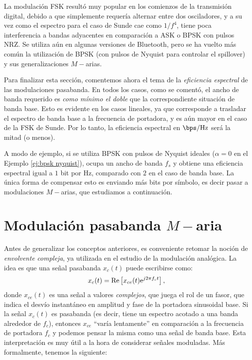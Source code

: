 \begin{ejemplo}
La modulación FSK resultó muy popular en los comienzos de la transmisión digital, debido a que simplemente requería alternar entre dos osciladores, y a su vez como el espectro para el caso de Sunde cae como $1/f^4$, tiene poca interferencia a bandas adyacentes en comparación a ASK o BPSK con pulsos NRZ. Se utiliza aún en algunas versiones de Bluetooth, pero se ha vuelto más común la utilización de BPSK (con pulsos de Nyquist para controlar el spillover) y sus generalizaciones $M-$arias.
\end{ejemplo}

Para finalizar esta sección, comentemos ahora el tema de la \emph{eficiencia espectral} de las modulaciones pasabanda. En todos los casos, como se comentó, el ancho de banda requerido es \emph{como mínimo el doble} que la correspondiente situación de banda base. Esto es evidente en los casos lineales, ya que corresponde a trasladar el espectro de banda base a la frecuencia de portadora, y es aún mayor en el caso de la FSK de Sunde. Por lo tanto, la eficiencia espectral en $\unit{\bps/\hertz}$ será la mitad (o menos).

A modo de ejemplo, si se utiliza BPSK con pulsos de Nyquist ideales ($\alpha=0$ en el Ejemplo \ref{ej:bpsk nyquist}), ocupa un ancho de banda $f_s$ y obtiene una eficiencia espectral igual a $1$ bit por $\unit{\hertz}$, comparado con $2$ en el caso de banda base. La única forma de compensar esto es enviando más bits por símbolo, es decir pasar a modulaciones $M-$arias, que estudiamos a continuación.

\section{Modulación pasabanda $M-$aria}\label{sec:modulacion pasabanda m aria}

Antes de generalizar los conceptos anteriores, es conveniente retomar la noción de \emph{envolvente compleja}, ya utilizada en el estudio de la modulación analógica. La idea es que una señal pasabanda $x_c(t)$ puede escribirse como:
\begin{equation}\label{eq:transformada pasabanda}
    x_c(t) = \mathrm{Re}\left[x_{ce}(t)\mathrm{e}^{j2\pi f_c t}\right],
\end{equation}
donde $x_{ce}(t)$ es una señal a valores \emph{complejos}, que juega el rol de un fasor, que indica el desvío instantáneo en amplitud y fase de la portadora sinusoidal base. Si la señal $x_c(t)$ es pasabanda (es decir, tiene un espectro acotado a una banda alrededor de $f_c$), entonces $x_{ce}$ ``varía lentamente'' en comparación a la frecuencia de portadora $f_c$ y podemos pensar la misma como una señal de banda base. Esta interpretación es muy útil a la hora de considerar señales moduladas. Más formalmente, tenemos la siguiente:

